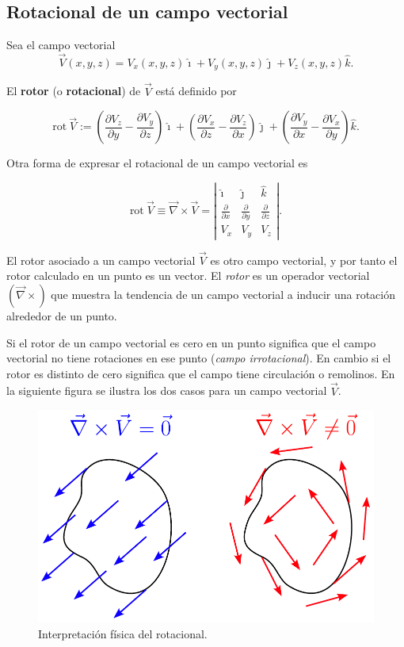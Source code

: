 \subsection*{Rotacional de un campo vectorial}

Sea el campo vectorial
$$\vec{V} (x,y,z) = V_x(x,y,z) \hat{\imath} + V_y(x,y,z) \hat{\jmath} + V_z(x,y,z) \hat{k}.$$

El \textbf{rotor} (o \textbf{rotacional}) de $\vec{V}$ está definido por 
\begin{shaded}
 $$\mbox{rot} ~ \vec{V} := \left( \frac{\partial V_z}{\partial y} - \frac{\partial V_y}{\partial z} \right) \hat{\imath} + \left( \frac{\partial V_x}{\partial z} - \frac{\partial V_z}{\partial x} \right) \hat{\jmath} + \left( \frac{\partial V_y}{\partial x} - \frac{\partial V_x}{\partial y} \right) \hat{k}.$$   
\end{shaded}

Otra forma de expresar el rotacional de un campo vectorial es
\begin{shaded}
$$\mbox{rot} ~ \vec{V} \equiv \vec{\nabla} \times \vec{V} = \left| \begin{array}{ccc}
\hat{\imath} & \hat{\jmath} & \hat{k}  \\
\frac{\partial}{\partial x} & \frac{\partial}{\partial y} & \frac{\partial}{\partial z}  \\
V_x & V_y & V_z
\end{array} \right|.$$  
\end{shaded}

El rotor asociado a un campo vectorial $\vec{V}$ es otro campo vectorial, y por tanto el rotor calculado en un punto es un vector. El \textit{rotor} es un operador vectorial $(\vec{\nabla} \times)$ que muestra la tendencia de un campo vectorial a inducir una rotación alrededor de un punto.

Si el rotor de un campo vectorial es cero en un punto significa que el campo vectorial no tiene rotaciones en ese punto (\textit{campo irrotacional}). En cambio si el rotor es distinto de cero significa que el campo tiene circulación o remolinos. En la siguiente figura se ilustra los dos casos para un campo vectorial $\Vec{V}$.

\begin{figure}[H]
    \centering
    \includegraphics[scale = 0.52]{Figuras/Rotor.pdf}
    \caption{Interpretación física del rotacional.}
    \label{fig:rotor}
\end{figure}

